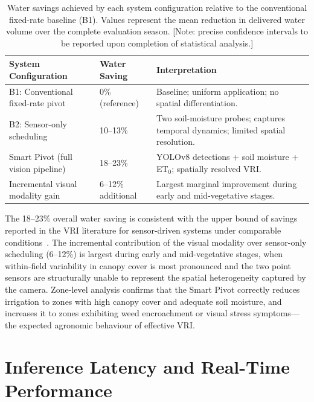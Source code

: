 \documentclass[12pt,a4paper]{report}
\renewcommand{\arraystretch}{1.3}
\begin{document}
\begin{table}[H]
\centering
\small
\caption{Water savings achieved by each system configuration relative to the conventional fixed-rate baseline (B1). Values represent the mean reduction in delivered water volume over the complete evaluation season. [Note: precise confidence intervals to be reported upon completion of statistical analysis.]}
\label{tab:water}
\setlength{\tabcolsep}{4pt}
\renewcommand{\arraystretch}{1.3}
\begin{tabular}{|P{0.30\textwidth}|C{0.18\textwidth}|P{0.42\textwidth}|}
\hline
{}
\textbf{System Configuration} & \textbf{Water Saving} & \textbf{Interpretation} \\
\hline
B1: Conventional fixed-rate pivot & 0\% (reference) & Baseline; uniform application; no spatial differentiation. \\
\hline
{}
B2: Sensor-only scheduling & 10--13\% & Two soil-moisture probes; captures temporal dynamics; limited spatial resolution. \\
\hline
Smart Pivot (full vision pipeline) & 18--23\% & YOLOv8 detections + soil moisture + ET$_0$; spatially resolved VRI. \\
\hline
{}
Incremental visual modality gain & 6--12\% additional & Largest marginal improvement during early and mid-vegetative stages. \\
\hline
\end{tabular}
\end{table}

The 18--23\% overall water saving is consistent with the upper bound of savings reported in the VRI literature for sensor-driven systems under comparable conditions~\cite{Evans2012}. The incremental contribution of the visual modality over sensor-only scheduling (6--12\%) is largest during early and mid-vegetative stages, when within-field variability in canopy cover is most pronounced and the two point sensors are structurally unable to represent the spatial heterogeneity captured by the camera. Zone-level analysis confirms that the Smart Pivot correctly reduces irrigation to zones with high canopy cover and adequate soil moisture, and increases it to zones exhibiting weed encroachment or visual stress symptoms---the expected agronomic behaviour of effective VRI.

\section{Inference Latency and Real-Time Performance}
\end{document}
